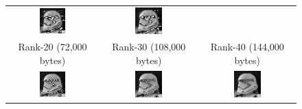 \begin{alttitles}
\begin{figure}[H]
\begin{tabular}{ccc}
\includegraphics[width=0.3\textwidth]{approx09.png} &
\includegraphics[width=0.3\textwidth]{approx12.png}\\
\smallskip
\scriptsize{Rank-20 (72,000 bytes)} &
\scriptsize{Rank-30 (108,000 bytes)} &
\scriptsize{Rank-40 (144,000 bytes)} \\
\includegraphics[width=0.3\textwidth]{approx20.png} &
\includegraphics[width=0.3\textwidth]{approx30.png} &
\includegraphics[width=0.3\textwidth]{approx40.png}\\

\end{tabular}
\end{figure}
\end{alttitles}
